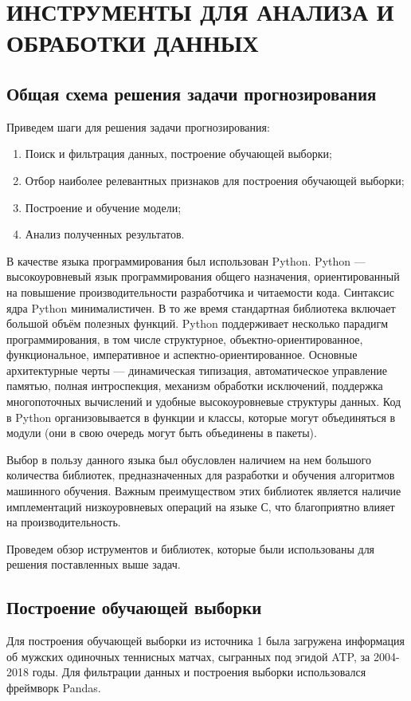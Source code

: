 \newpage
\section{ИНСТРУМЕНТЫ ДЛЯ АНАЛИЗА И ОБРАБОТКИ ДАННЫХ}

\subsection{Общая схема решения задачи прогнозирования}
Приведем шаги для решения задачи прогнозирования:
\begin {enumerate}
	\item Поиск и фильтрация данных, построение обучающей выборки;
	\item Отбор наиболее релевантных признаков для построения обучающей выборки;	
	\item Построение и обучение модели;
	\item Анализ полученных результатов.
\end{enumerate}

В качестве языка программирования был использован Python. Python — высокоуровневый язык программирования общего назначения, ориентированный на повышение производительности разработчика и читаемости кода. Синтаксис ядра Python минималистичен. В то же время стандартная библиотека включает большой объём полезных функций. Python поддерживает несколько парадигм программирования, в том числе структурное, объектно-ориентированное, функциональное, императивное и аспектно-ориентированное. Основные архитектурные черты — динамическая типизация, автоматическое управление памятью, полная интроспекция, механизм обработки исключений, поддержка многопоточных вычислений и удобные высокоуровневые структуры данных. Код в Python организовывается в функции и классы, которые могут объединяться в модули (они в свою очередь могут быть объединены в пакеты).

Выбор в пользу данного языка был обусловлен наличием на нем большого количества библиотек, предназначенных для разработки и обучения алгоритмов машинного обучения. Важным преимуществом этих библиотек является наличие имплементаций низкоуровневых операций на языке С, что благоприятно влияет на производительность. 

Проведем обзор иструментов и библиотек, которые были использованы для решения поставленных выше задач.

\subsection{Построение обучающей выборки}
Для построения обучающей выборки из источника 1 была загружена информация об мужских одиночных теннисных матчах, сыгранных под эгидой ATP, за 2004-2018 годы. Для фильтрации данных и построения выборки использовался фреймворк Pandas.

